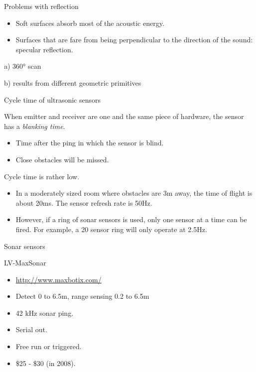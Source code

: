 \documentclass[compress]{beamer}
\begin{document}
\begin{frame}{Problems with reflection}

\begin{itemize}

\item
  Soft surfaces absorb most of the acoustic energy.
\item
  Surfaces that are fare from being perpendicular to the direction of
  the sound: specular reflection.
\end{itemize}

a) 360° scan

b) results from different geometric primitives

\end{frame}

\begin{frame}{Cycle time of ultrasonic sensors}

When emitter and receiver are one and the same piece of hardware, the
sensor has a \emph{blanking time}.

\begin{itemize}

\item
  Time after the ping in which the sensor is blind.
\item
  Close obstacles will be missed.
\end{itemize}

Cycle time is rather low.

\begin{itemize}

\item
  In a moderately sized room where obstacles are 3m away, the time of
  flight is about 20ms. The sensor refresh rate is 50Hz.
\item
  However, if a ring of sonar sensors is used, only one sensor at a time
  can be fired. For example, a 20 sensor ring will only operate at
  2.5Hz.
\end{itemize}

\end{frame}

\begin{frame}{Sonar sensors}

LV-MaxSonar

\begin{itemize}

\item
  \url{http://www.maxbotix.com/}
\item
  Detect 0 to 6.5m, range sensing 0.2 to 6.5m
\item
  42 kHz sonar ping.
\item
  Serial out.
\item
  Free run or triggered.
\item
  \$25 - \$30 (in 2008).
\end{itemize}

\end{frame}
\end{document}

